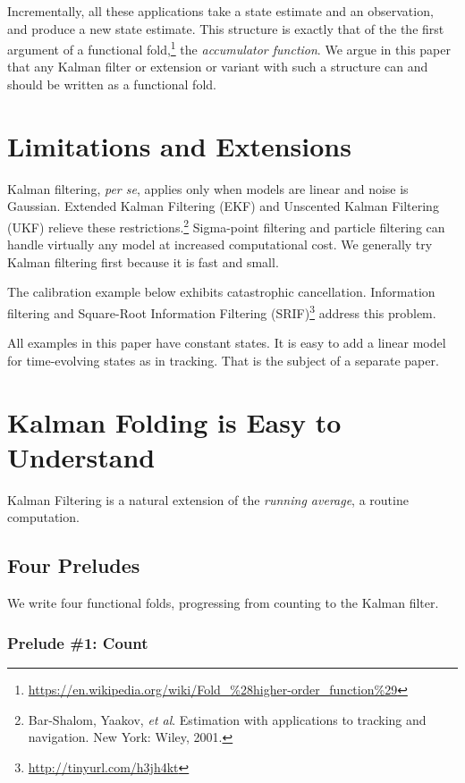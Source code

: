 \documentclass[10pt,oneside,x11names]{article}
\begin{document}
Incrementally, all these applications take a state estimate and an
observation, and produce a new state estimate. This structure is exactly that of
the the first argument of a functional fold,\footnote{\url{https://en.wikipedia.org/wiki/Fold_\%28higher-order_function\%29}} the \emph{accumulator
function}. We argue in this paper that any Kalman filter or extension or variant
with such a structure can and should be written as a functional fold.

\section{Limitations and Extensions}
\label{sec:orgheadline3}

Kalman filtering, \emph{per se}, applies only when models are linear and noise is
Gaussian. Extended Kalman Filtering (EKF) and Unscented Kalman Filtering (UKF)
relieve these restrictions.\footnote{Bar-Shalom, Yaakov, \emph{et al}. Estimation with applications to tracking and navigation. New York: Wiley, 2001.} Sigma-point filtering and particle
filtering can handle virtually any model at increased computational cost. We
generally try Kalman filtering first because it is fast and small.

The calibration example below exhibits catastrophic cancellation. Information
filtering and Square-Root Information Filtering (SRIF)\footnote{\url{http://tinyurl.com/h3jh4kt}} address this
problem.

All examples in this paper have constant states. It is easy to add a linear
model for time-evolving states as in tracking. That is the subject of a
separate paper.

\section{Kalman Folding is Easy to Understand}
\label{sec:orgheadline20}

Kalman Filtering is a natural extension of the \emph{running average}, a routine
computation.

\subsection{Four Preludes}
\label{sec:orgheadline17}

We write four functional folds, progressing from counting to the Kalman
filter.

\subsubsection{Prelude \#1: Count}
\label{sec:orgheadline4}
\end{document}
